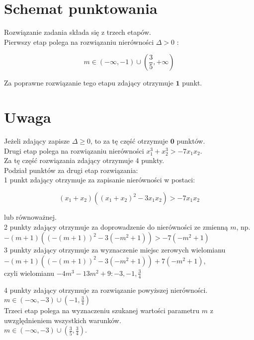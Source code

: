 \documentclass[10pt]{article}
\begin{document}
\section*{Schemat punktowania}
Rozwiązanie zadania składa się z trzech etapów.\\
Pierwszy etap polega na rozwiązaniu nierówności $\Delta>0$ :

$$
m \in(-\infty,-1) \cup\left(\frac{3}{5},+\infty\right)
$$

Za poprawne rozwiązanie tego etapu zdający otrzymuje $\mathbf{1}$ punkt.

\section*{Uwaga}
Jeżeli zdający zapisze $\Delta \geq 0$, to za tę część otrzymuje $\mathbf{0}$ punktów.\\
Drugi etap polega na rozwiązaniu nierówności $x_{1}^{3}+x_{2}^{3}>-7 x_{1} x_{2}$.\\
Za tę część rozwiązania zdający otrzymuje 4 punkty.\\
Podział punktów za drugi etap rozwiązania:\\
1 punkt zdający otrzymuje za zapisanie nierówności w postaci:

$$
\left(x_{1}+x_{2}\right)\left(\left(x_{1}+x_{2}\right)^{2}-3 x_{1} x_{2}\right)>-7 x_{1} x_{2}
$$

lub równoważnej.\\
2 punkty zdający otrzymuje za doprowadzenie do nierówności ze zmienną $m$, np.\\
$-(m+1)\left((-(m+1))^{2}-3\left(-m^{2}+1\right)\right)>-7\left(-m^{2}+1\right)$\\
3 punkty zdający otrzymuje za wyznaczenie miejsc zerowych wielomianu\\
$-(m+1)\left((-(m+1))^{2}-3\left(-m^{2}+1\right)\right)+7\left(-m^{2}+1\right)$,\\
czyli wielomianu $-4 m^{3}-13 m^{2}+9:-3,-1, \frac{3}{4}$

4 punkty zdający otrzymuje za rozwiązanie powyższej nierówności.\\
$m \in(-\infty,-3) \cup\left(-1, \frac{3}{4}\right)$\\
Trzeci etap polega na wyznaczeniu szukanej wartości parametru $m$ z uwzględnieniem wszystkich warunków.\\
$m \in(-\infty,-3) \cup\left(\frac{3}{5}, \frac{3}{4}\right)$.
\end{document}
